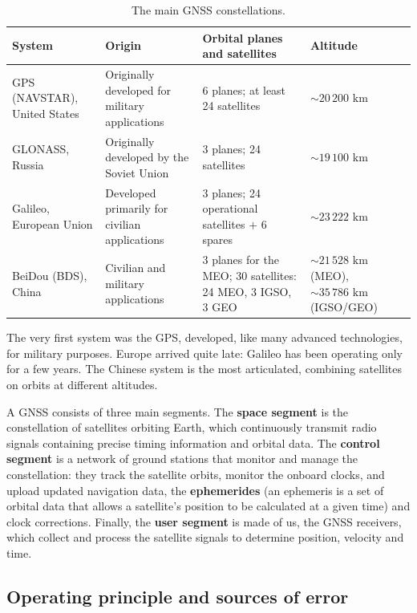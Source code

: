 \documentclass[letterpaper,11pt,leqno]{book}
\begin{document}
\begin{table}[!htbp]
\centering
\caption{The main GNSS constellations.}
\label{tab:gnss_constellations}
\begin{tabular*}{\textwidth}{p{2.6cm}@{\extracolsep\fill}p{3.6cm}p{4.4cm}p{3cm}}
\toprule
System & Origin & Orbital planes and satellites & Altitude \\
\midrule
GPS (NAVSTAR), United States & Originally developed for military applications & 6 planes; at least 24 satellites & $\sim 20\,200\text{ km}$ \\
GLONASS, Russia & Originally developed by the Soviet Union & 3 planes; 24 satellites & $\sim 19\,100\text{ km}$ \\
Galileo, European Union & Developed primarily for civilian applications & 3 planes; 24 operational satellites $+$ 6 spares & $\sim 23\,222\text{ km}$ \\
BeiDou (BDS), China & Civilian and military applications & 3 planes for the MEO; 30 satellites: 24 MEO, 3 IGSO, 3 GEO & $\sim 21\,528\text{ km}$ (MEO), $\sim 35\,786\text{ km}$ (IGSO/GEO) \\
\bottomrule
\end{tabular*}
\end{table}

The very first system was the GPS, developed, like many advanced technologies, for military purposes. Europe arrived quite late: Galileo has been operating only for a few years. The Chinese system is the most articulated, combining satellites on orbits at different altitudes.

A GNSS consists of three main segments. The \textbf{space segment} is the constellation of satellites orbiting Earth, which continuously transmit radio signals containing precise timing information and orbital data. The \textbf{control segment} is a network of ground stations that monitor and manage the constellation: they track the satellite orbits, monitor the onboard clocks, and upload updated navigation data, the \textbf{ephemerides} (an ephemeris is a set of orbital data that allows a satellite's position to be calculated at a given time) and clock corrections. Finally, the \textbf{user segment} is made of us, the GNSS receivers, which collect and process the satellite signals to determine position, velocity and time.

\subsection{Operating principle and sources of error}
\end{document}
